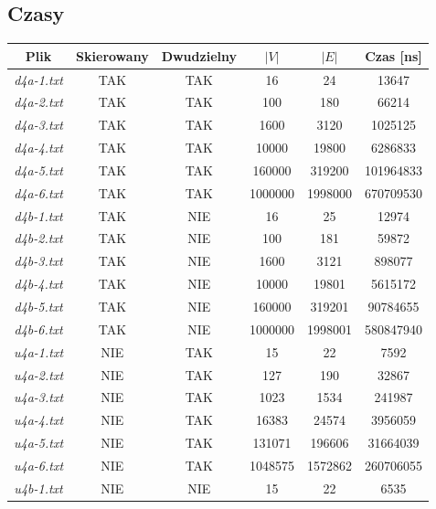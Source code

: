 \documentclass{article}
\begin{document}
\subsection{Czasy}
\begin{table}[H]
\begin{adjustbox}{center}
\begin{tabular}{|c|c|c|c|c|c|}
    \hline
    Plik & Skierowany & Dwudzielny & $|V|$ & $|E|$ & Czas [ns]\\
    \hline
    \textit{d4a-1.txt} & TAK & TAK & 16 & 24 & 13647\\
    \hline
    \textit{d4a-2.txt} & TAK & TAK & 100 & 180 & 66214\\
    \hline
    \textit{d4a-3.txt} & TAK & TAK & 1600 & 3120 & 1025125\\
    \hline
    \textit{d4a-4.txt} & TAK & TAK & 10000 & 19800 & 6286833\\
    \hline
    \textit{d4a-5.txt} & TAK & TAK & 160000 & 319200 & 101964833\\
    \hline
    \textit{d4a-6.txt} & TAK & TAK & 1000000 & 1998000 & 670709530\\
    \hline
    \textit{d4b-1.txt} & TAK & NIE & 16 & 25 & 12974\\
    \hline
    \textit{d4b-2.txt} & TAK & NIE & 100 & 181 & 59872\\
    \hline
    \textit{d4b-3.txt} & TAK & NIE & 1600 & 3121 & 898077\\
    \hline
    \textit{d4b-4.txt} & TAK & NIE & 10000 & 19801 & 5615172\\
    \hline
    \textit{d4b-5.txt} & TAK & NIE & 160000 & 319201 & 90784655\\
    \hline
    \textit{d4b-6.txt} & TAK & NIE & 1000000 & 1998001 & 580847940\\
    \hline
    \textit{u4a-1.txt} & NIE & TAK & 15 & 22 & 7592\\
    \hline
    \textit{u4a-2.txt} & NIE & TAK & 127 & 190 & 32867\\
    \hline
    \textit{u4a-3.txt} & NIE & TAK & 1023 & 1534 & 241987\\
    \hline
    \textit{u4a-4.txt} & NIE & TAK & 16383 & 24574 & 3956059\\
    \hline
    \textit{u4a-5.txt} & NIE & TAK & 131071 & 196606 & 31664039\\
    \hline
    \textit{u4a-6.txt} & NIE & TAK & 1048575 & 1572862 & 260706055\\
    \hline
    \textit{u4b-1.txt} & NIE & NIE & 15 & 22 & 6535\\

\end{tabular}
\end{adjustbox}
\end{table}
\end{document}
